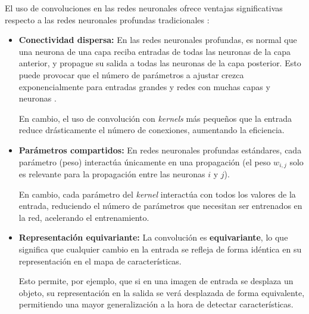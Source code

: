 El uso de convoluciones en las redes neuronales ofrece ventajas significativas  respecto a las redes neuronales profundas tradicionales \cite{Goodfellow-et-al-2016}:
\begin{itemize}
	\item \textbf{Conectividad dispersa:} En las redes neuronales profundas, es normal que una neurona de una capa reciba entradas de todas las neuronas de la capa anterior, y propague su salida a todas las neuronas de la capa posterior. Esto puede provocar que el número de parámetros a ajustar crezca exponencialmente para entradas grandes y redes con muchas capas y neuronas \cite{10.5555/3161223}.
	
	En cambio, el uso de convolución con \textit{kernels} más pequeños que la entrada reduce drásticamente el número de conexiones, aumentando la eficiencia.
	\item \textbf{Parámetros compartidos:} En redes neuronales profundas estándares, cada parámetro (peso) interactúa únicamente en una propagación (el peso $w_{i, j}$ solo es relevante para la propagación entre las neuronas $i$ y $j$).
	
	En cambio, cada parámetro del \textit{kernel} interactúa con todos los valores de la entrada, reduciendo el número de parámetros que necesitan ser entrenados en la red, acelerando el entrenamiento.
	\item \textbf{Representación equivariante:} La convolución es \textbf{equivariante}, lo que significa que cualquier cambio en la entrada se refleja de forma idéntica en su representación en el mapa de características.
	
	Esto permite, por ejemplo, que si en una imagen de entrada se desplaza un objeto, su representación en la salida se verá desplazada de forma equivalente, permitiendo una mayor generalización a la hora de detectar características.
\end{itemize}

